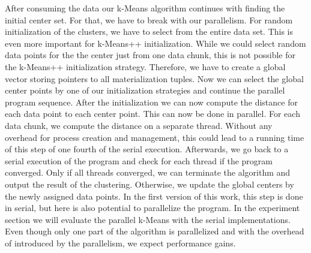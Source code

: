 After consuming the data our k-Means algorithm continues with finding the initial center set. For that, we have to break with our parallelism. For random initialization of the clusters, we have to select from the entire data set. This is even more important  for k-Means++ initialization. While we could select random data points for the the center just from one data chunk, this is not possible for the k-Means++ initialization strategy. Therefore, we have to create a global vector storing pointers to all materialization tuples. Now we can select the global center points by one of our initialization strategies and continue the parallel program sequence.
After the initialization we can now compute the distance for each data point to each center point. This can now be done in parallel. For each data chunk, we compute the distance on a separate thread. Without any overhead for process creation and management, this could lead to a running time of  this step of one fourth of the serial execution.
Afterwards, we go back to a serial execution of the program and check for each thread if the program converged. Only if all threads converged, we can terminate the algorithm and output the result of the clustering. Otherwise, we update the global centers by the newly assigned data points. In the first version of this work, this step is done in serial, but here is also potential to parallelize the program.
In the experiment section we will evaluate the parallel k-Means with the serial implementations. Even though only one part of the algorithm is parallelized and with the overhead of introduced by the parallelism, we expect performance gains.





